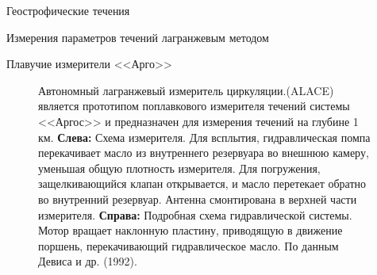 \begin{chapter}{Геострофические течения}
\begin{section}{Измерения параметров течений лагранжевым методом}
\begin{paragraph}{Плавучие измерители <<Арго>>}
\begin{figure}[h!]
\caption{Автономный лагранжевый измеритель циркуляции.(ALACE) является
прототипом поплавкового измерителя течений системы <<Аргос>> и
предназначен для измерения течений на глубине 1 км. \textbf{Слева:} Схема
измерителя. Для всплытия, гидравлическая помпа перекачивает масло из
внутреннего резервуара во внешнюю камеру, уменьшая общую плотность
измерителя. Для погружения, защелкивающийся клапан открывается, и
масло перетекает обратно во внутренний резервуар. Антенна смонтирована
в верхней части измерителя. \textbf{Справа:} Подробная схема гидравлической
системы. Мотор вращает наклонную пластину, приводящую в движение
поршень, перекачивающий гидравлическое масло. По данным Девиса и
др. (1992).}
\label{fig:alace}
\end{figure}
%
\end{paragraph}


\end{section}
\end{chapter}
